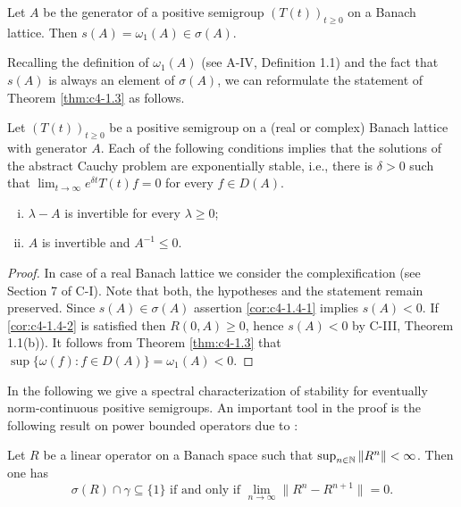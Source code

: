 \begin{theorem}\label{thm:c4-1.3}
Let $A$ be the generator of a positive semigroup $(T(t))_{t\geq 0}$ on a Banach lattice.
Then $s(A) = \omega_{1}(A) \in \sigma(A)$.
\end{theorem}

Recalling the definition of $\omega_{1}(A)$ (see A-IV, Definition 1.1) and the fact that $s(A)$ is always an element of $\sigma(A)$, we can reformulate the statement of Theorem \ref{thm:c4-1.3} as follows.

\begin{corollary}\label{cor:c4-1.4}
Let $(T(t))_{t\geq 0}$ be a positive semigroup on a (real or complex) Banach lattice with generator $A$.
Each of the following conditions implies that the solutions of the abstract Cauchy problem are exponentially stable, i.e., there is $\delta > 0$ such that $\lim_{t \to \infty} e^{\delta t}T(t)f = 0$ for every $f \in D(A)$.

\begin{enumerate}[(i)]
\item \label{cor:c4-1.4-1}
$\lambda - A$ is invertible for every $\lambda \geq 0$;
\item \label{cor:c4-1.4-2}
$A$ is invertible and $A^{-1} \leq 0$.
\end{enumerate}
\end{corollary}

\begin{proof}
In case of a real Banach lattice we consider the complexification (see Section 7 of C-I).
Note that both, the hypotheses and the statement remain preserved.
Since $s(A) \in \sigma(A)$ assertion \ref{cor:c4-1.4-1} implies $s(A) < 0$.
If \ref{cor:c4-1.4-2} is satisfied then $R(0,A) \geq 0$, hence $s(A) < 0$ by C-III, Theorem 1.1(b)).
It follows from Theorem \ref{thm:c4-1.3} that $\sup\{\omega(f) : f \in D(A)\} = \omega_{1}(A) < 0$.
\end{proof}

In the following we give a spectral characterization of stability for eventually norm-continuous positive semigroups.
An important tool in the proof is the following result on power bounded operators due to \citet{katznelsontzafriri:1984}:

Let $R$ be a linear operator on a Banach space such that $\sup_{n \in \mathbb{N}} \|R^{n}\| < \infty$.
Then one has
\begin{equation}\label{eq:c4-1.4}
\sigma(R) \cap \gamma \subseteq \{1\} \text{ if and only if } \lim_{n \to \infty} \|R^{n} - R^{n+1}\| = 0.
\end{equation}

